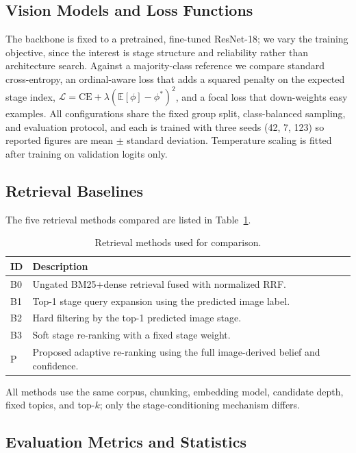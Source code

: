 \documentclass[conference]{IEEEtran}
\begin{document}
\subsection{Vision Models and Loss Functions}

The backbone is fixed to a pretrained, fine-tuned ResNet-18; we vary the training objective, since the interest is stage structure and reliability rather than architecture search. Against a majority-class reference we compare standard cross-entropy, an ordinal-aware loss that adds a squared penalty on the expected stage index, $\mathcal{L}=\mathrm{CE}+\lambda(\mathbb{E}[\phi]-\phi^*)^2$, and a focal loss that down-weights easy examples. All configurations share the fixed group split, class-balanced sampling, and evaluation protocol, and each is trained with three seeds (42, 7, 123) so reported figures are mean $\pm$ standard deviation. Temperature scaling is fitted after training on validation logits only.

\subsection{Retrieval Baselines}

The five retrieval methods compared are listed in Table~\ref{tab:baselines}.

\begin{table}[t]
\centering
\caption{Retrieval methods used for comparison.}
\label{tab:baselines}
\small
\begin{tabular}{lp{}}
\toprule
\textbf{ID} & \textbf{Description} \\
\midrule
B0 & Ungated BM25+dense retrieval fused with normalized RRF. \\
B1 & Top-1 stage query expansion using the predicted image label. \\
B2 & Hard filtering by the top-1 predicted image stage. \\
B3 & Soft stage re-ranking with a fixed stage weight. \\
P & Proposed adaptive re-ranking using the full image-derived belief and confidence. \\
\bottomrule
\end{tabular}
\end{table}

All methods use the same corpus, chunking, embedding model, candidate depth, fixed topics, and top-$k$; only the stage-conditioning mechanism differs.

\subsection{Evaluation Metrics and Statistics}
\end{document}
